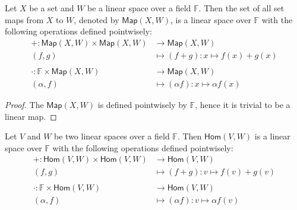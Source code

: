 \documentclass[
	11pt, %
	fleqn, %
	a4paper, %
]{LegrandOrangeBook}
\newcommand{\Hom}{\mathsf{Hom}} %
\newcommand{\F}{\mathbb{F}} %
\newcommand{\Map}{\mathsf{Map}} %
\begin{document}
\begin{proposition}
    Let $X$ be a set and $W$ be a linear space over a field $\F$. Then the set of all set maps from $X$ to $W$, denoted by $\Map(X, W)$, is a linear space over $\F$ with the following operations defined pointwisely:
    \[
        \begin{split}
            + : \Map(X, W) \times \Map(X, W) &\to \Map(X, W) \\
            (f,g) &\mapsto (f + g) : x \mapsto f(x) + g(x) \\ \\
            \cdot : \F \times \Map(X, W) &\to \Map(X, W) \\
            (\alpha,f) &\mapsto (\alpha f) : x \mapsto \alpha f(x)
        \end{split}
    \]
\end{proposition}

\begin{proof}
    The $\Map(X, W)$ is defined pointwisely by $\F$, hence it is trivial to be a linear map.
\end{proof}

\begin{proposition}
    Let $V$ and $W$ be two linear spaces over a field $\F$. Then $\Hom(V, W)$ is a linear space over $\F$ with the following operations defined pointwisely:
    \[
        \begin{split}
            + : \Hom(V, W) \times \Hom(V, W) &\to \Hom(V, W) \\
            (f,g) &\mapsto (f + g): v \mapsto f(v) + g(v) \\ \\
            \cdot : \F \times \Hom(V, W) &\to \Hom(V, W) \\
            (\alpha,f) &\mapsto (\alpha f): v \mapsto \alpha f(v)
        \end{split}
    \]
\end{proposition}
\end{document}
